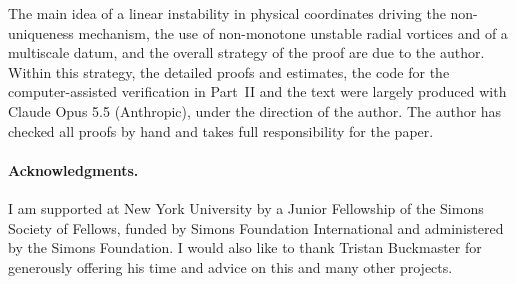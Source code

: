 The main idea of a linear instability in physical coordinates driving the
non-uniqueness mechanism, the use of non-monotone unstable radial vortices and of
a multiscale datum, and the overall strategy of the proof are due to the author.
Within this strategy, the detailed proofs and estimates, the code for the
computer-assisted verification in Part~II and the text were largely produced with
Claude Opus 5.5 (Anthropic), under the direction of the author. The author has
checked all proofs by hand and takes full responsibility for the paper.

\paragraph{Acknowledgments.} I am supported at New York University by a Junior
Fellowship of the Simons Society of Fellows, funded by Simons Foundation
International and administered by the Simons Foundation. I would also like to thank
Tristan Buckmaster for generously offering his time and advice on this and many
other projects.
